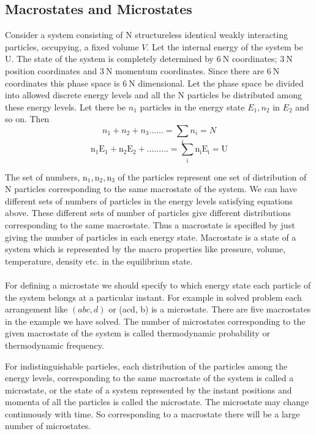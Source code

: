 \subsection{Macrostates and Microstates}
\par Consider a system consisting of $\mathrm{N}$ structureless identical weakly interacting particles, occupying, a fixed volume $V$. Let the internal energy of the system be U. The state of the system is completely determined by $6 \mathrm{~N}$ coordinates; $3 \mathrm{~N}$ position coordinates and $3 \mathrm{~N}$ momentum coordinates. Since there are $6 \mathrm{~N}$ coordinates this phase space is $6 \mathrm{~N}$ dimensional. Let the phase space be divided into allowed discrete energy levels and all the $\mathrm{N}$ particles be distributed among these energy levels. Let there be $n_{1}$ particles in the energy state $E_{1}, n_{2}$ in $E_{2}$ and so on. Then
$$n_{1}+n_{2}+n_{3} \ldots \ldots=\sum_{i} n_{i}=N$$
$$\mathrm{n}_{1} \mathrm{E}_{1}+\mathrm{n}_{2} \mathrm{E}_{2}+\ldots \ldots \ldots=\sum_{\mathrm{i}} \mathrm{n}_{\mathrm{i}} \mathrm{E}_{\mathrm{i}}=\mathrm{U}$$
\par The set of numbers, $\mathrm{n}_{1}, \mathrm{n}_{2}, \mathrm{n}_{3}$ of the particles represent one set of distribution of $\mathrm{N}$ particles corresponding to the same macrostate of the system. We can have different sets of numbers of particles in the energy levels satisfying equations above. These different sets of number of particles give different distributions corresponding to the same macrostate. Thus a macrostate is specifled by just giving the number of particles in each energy state. Macrostate is a state of a system which is represented by the macro properties like pressure, volume, temperature, density etc. in the equilibrium state.\\\\
For defining a microstate we should specify to which energy state each particle of the system belongs at a particular instant. For example in solved problem each arrangement like $(a b c, d)$ or (acd, b) is a microstate. There are five macrostates in the example we have solved. The number of microstates corresponding to the given macrostate of the system is called thermodynamic probability or thermodynamic frequency.
\par For indistinguishable partieles, each distribution of the particles among the energy levels, corresponding to the same macrostate of the system is called a microstate, or the state of a system represented by the instant positions and momenta of all the particles is called the microstate. The microstate may change continuously with time. So corresponding to a macrostate there will be a large number of microstates.

